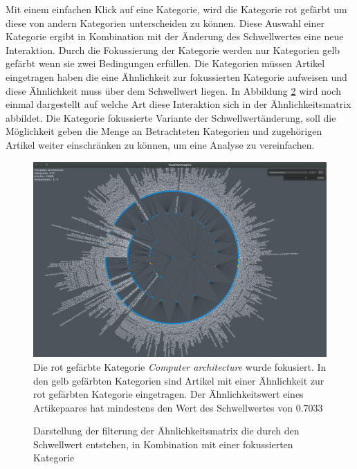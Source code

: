 Mit einem einfachen Klick auf eine Kategorie, wird die Kategorie rot gefärbt um diese von andern Kategorien unterscheiden zu können.
Diese Auswahl einer Kategorie ergibt in Kombination mit der Änderung des Schwellwertes eine neue Interaktion.
Durch die Fokussierung der Kategorie werden nur Kategorien gelb gefärbt wenn sie zwei Bedingungen erfüllen.
Die Kategorien müssen Artikel eingetragen haben die eine Ähnlichkeit zur fokussierten Kategorie aufweisen und diese Ähnlichkeit muss über dem Schwellwert liegen.
In Abbildung \ref{fig:simM-threshold-focus-cat} wird noch einmal dargestellt auf welche Art diese Interaktion sich in der Ähnlichkeitsmatrix abbildet.
Die Kategorie fokussierte Variante der Schwellwertänderung, soll die Möglichkeit geben die Menge an Betrachteten Kategorien und zugehörigen Artikel weiter einschränken zu können, um eine Analyse zu vereinfachen.

\begin{figure}
    \centering
    \includegraphics[width=\textwidth]{images/threshold-7033-lvl3-focus}
    \caption{Die rot gefärbte Kategorie \emph{Computer architecture} wurde fokusiert. In den gelb gefärbten Kategorien sind Artikel mit einer Ähnlichkeit zur rot gefärbten Kategorie eingetragen. Der Ähnlichkeitswert eines Artikepaares hat mindestens den Wert des Schwellwertes von $0.7033$}
    \label{fig:threshold-focus-cat}
\end{figure}

\begin{figure}
    \begin{tikzpicture}
    \end{tikzpicture}
    \caption{Darstellung der filterung der Ähnlichkeitsmatrix die durch den Schwellwert entstehen, in Kombination mit einer fokussierten Kategorie}
    \label{fig:simM-threshold-focus-cat}
\end{figure}


